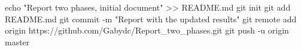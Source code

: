 echo "Report two phases, initial document" >> README.md
git init
git add README.md
git commit -m "Report with the updated results"
git remote add origin https://github.com/Gabydc/Report_two_phases.git
git push -u origin master
